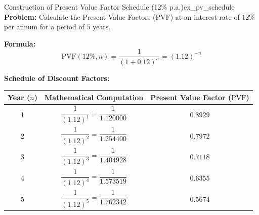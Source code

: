 \begin{example}{Construction of Present Value Factor Schedule (12\% p.a.)}{ex_pv_schedule}
\textbf{Problem:}
Calculate the Present Value Factors ($\text{PVF}$) at an interest rate of $12\%$ per annum for a period of $5$ years.

\tcbline
\textbf{Formula:}
\begin{equation*}
    \text{PVF}(12\%, n) = \frac{1}{(1 + 0.12)^n} = (1.12)^{-n}
\end{equation*}

\textbf{Schedule of Discount Factors:}
\begin{center}
\small
\begin{tabular}{ccc}
\toprule
\textbf{Year ($n$)} & \textbf{Mathematical Computation} & \textbf{Present Value Factor ($\text{PVF}$)} \\
\midrule
1 & $\dfrac{1}{(1.12)^1} = \dfrac{1}{1.120000}$ & $\mathbf{0.8929}$ \\[0.5em]
2 & $\dfrac{1}{(1.12)^2} = \dfrac{1}{1.254400}$ & $\mathbf{0.7972}$ \\[0.5em]
3 & $\dfrac{1}{(1.12)^3} = \dfrac{1}{1.404928}$ & $\mathbf{0.7118}$ \\[0.5em]
4 & $\dfrac{1}{(1.12)^4} = \dfrac{1}{1.573519}$ & $\mathbf{0.6355}$ \\[0.5em]
5 & $\dfrac{1}{(1.12)^5} = \dfrac{1}{1.762342}$ & $\mathbf{0.5674}$ \\
\bottomrule
\end{tabular}
\end{center}
\end{example}

